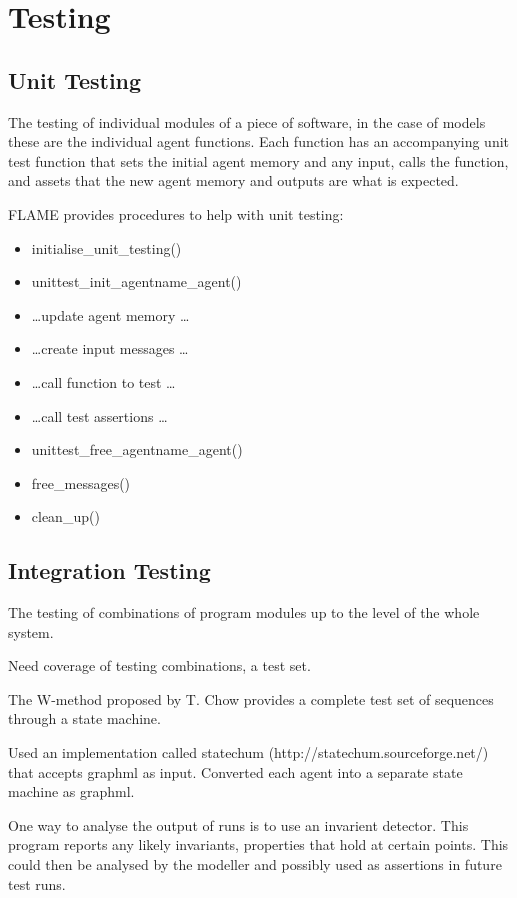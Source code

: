 \section{Testing}



\subsection{Unit Testing}

The testing of individual modules of a piece of software, in the case of models
these are the individual agent functions. Each function has an accompanying
unit test function that sets the initial agent memory and any input, calls the
function, and assets that the new agent memory and outputs are what is expected.

FLAME provides procedures to help with unit testing:

\begin{itemize}
  \item initialise\_unit\_testing()
  \item unittest\_init\_agentname\_agent()
  \item \ldots update agent memory \ldots
  \item \ldots create input messages \ldots
  \item \ldots call function to test \ldots
  \item \ldots call test assertions \ldots
  \item unittest\_free\_agentname\_agent()
  \item free\_messages()
  \item clean\_up()
\end{itemize}

\subsection{Integration Testing}

The testing of combinations of program modules up to the level of the whole
system.

Need coverage of testing combinations, a test set.

The W-method proposed by T. Chow \cite{CHOW:1978} provides a complete test set
of sequences through a state machine.

Used an implementation called statechum (http://statechum.sourceforge.net/)
that accepts graphml as input. Converted each agent into a separate state
machine as graphml. 

One way to analyse the output of runs is to use an invarient detector. This
program reports any likely invariants, properties that hold at certain points.
This could then be analysed by the modeller and possibly used as assertions in
future test runs.
